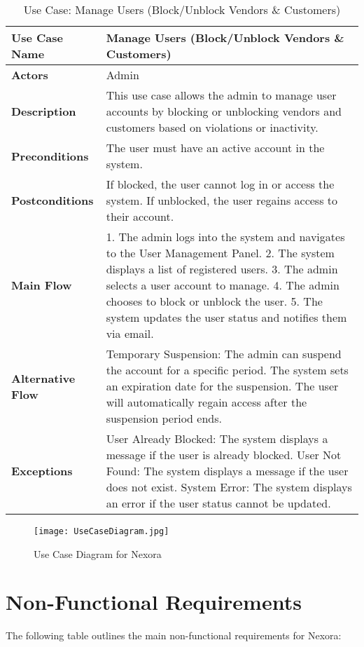 \begin{table}[h]
\centering
\begin{tabular}{|p{3cm}|p{10cm}|}
\hline
\textbf{Use Case Name} & Manage Users (Block/Unblock Vendors \& Customers) \\
\hline
\textbf{Actors} & Admin \\
\hline
\textbf{Description} & This use case allows the admin to manage user accounts by blocking or unblocking vendors and customers based on violations or inactivity. \\
\hline
\textbf{Preconditions} & The user must have an active account in the system. \\
\hline
\textbf{Postconditions} & If blocked, the user cannot log in or access the system. If unblocked, the user regains access to their account. \\
\hline
\textbf{Main Flow} & 1. The admin logs into the system and navigates to the User Management Panel. 2. The system displays a list of registered users. 3. The admin selects a user account to manage. 4. The admin chooses to block or unblock the user. 5. The system updates the user status and notifies them via email. \\
\hline
\textbf{Alternative Flow} & Temporary Suspension: The admin can suspend the account for a specific period. The system sets an expiration date for the suspension. The user will automatically regain access after the suspension period ends. \\
\hline
\textbf{Exceptions} & User Already Blocked: The system displays a message if the user is already blocked. User Not Found: The system displays a message if the user does not exist. System Error: The system displays an error if the user status cannot be updated. \\
\hline
\end{tabular}
\caption{Use Case: Manage Users (Block/Unblock Vendors \& Customers)}
\end{table}

\begin{figure}[h]
    \centering
    \texttt{[image: UseCaseDiagram.jpg]}
    \caption{Use Case Diagram for Nexora}
    \label{fig:use-case-diagram}
\end{figure}

\clearpage
\section{Non-Functional Requirements}
The following table outlines the main non-functional requirements for Nexora:

